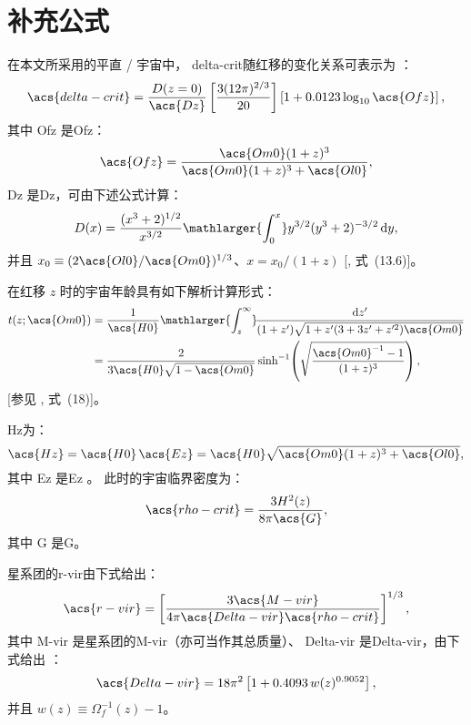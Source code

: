 
\chapter{补充公式}
\label{chap:formulas}


在本文所采用的平直 \lcdm/ 宇宙中，
\ac{delta-crit}随红移的变化关系可表示为 \cite{kitayama1996,randall2002}：
\begin{equation}
  \label{eq:delta-crit}
  \acs{delta-crit} = \frac{D(z=0)}{\acs{Dz}}
    \left[ \frac{3 (12\pi)^{2/3}}{20} \right]
    \left[1 + 0.0123 \log_{10} \acs{Ofz} \right] ,
\end{equation}
其中 \acs{Ofz} 是\acl{Ofz}：
\begin{equation}
  \label{eq:omega-fz}
  \acs{Ofz} = \frac{\acs{Om0} (1+z)^3}{\acs{Om0} (1+z)^3 + \acs{Ol0}} ,
\end{equation}
\acs{Dz} 是\acl{Dz}，可由下述公式计算：
\begin{equation}
  \label{eq:growth-factor}
  D(x) = \frac{(x^3 + 2)^{1/2}}{x^{3/2}}
    \mathlarger{\int_0^x} y^{3/2} (y^3 + 2)^{-3/2} \,\D{y} ,
\end{equation}
并且 $x_0 \equiv (2 \acs{Ol0}/\acs{Om0})^{1/3}$、$x = x_0 / (1+z)$
[\textcite{peebles1980}, 式~(13.6)]。

在红移 $z$ 时的宇宙年龄具有如下解析计算形式：
\begin{align}
  \label{eq:universe-age}
  t(z; \acs{Om0})
    & = \frac{1}{\acs{H0}} \mathlarger{\int_z^{\infty}}
      \!\frac{\D{z'}}{(1+z')\sqrt{1 + z' (3+3z'+z'^2) \acs{Om0}}}
      \nonumber \\
    & = \frac{2}{3 \acs{H0} \sqrt{1-\acs{Om0}}} \sinh^{-1}
      \!\left( \sqrt{\frac{\acs{Om0}^{-1} - 1}{(1+z)^3}} \right),
\end{align}
[参见 \textcite{thomas2000}, 式~(18)]。

\acl{Hz}为：
\begin{equation}
  \label{eq:hubble-z}
  \acs{Hz} = \acs{H0} \, \acs{Ez}
    = \acs{H0} \sqrt{\acs{Om0} (1+z)^3 + \acs{Ol0}} ,
\end{equation}
其中 \acs{Ez} 是\acl{Ez} \cite{hogg1999}。
此时的宇宙临界密度为：
\begin{equation}
  \label{eq:rho-crit}
  \acs{rho-crit} = \frac{3 H^2(z)}{8 \pi \acs{G}} ,
\end{equation}
其中 \acs{G} 是\acl{G}。

星系团的\ac{r-vir}由下式给出：
\begin{equation}
  \label{eq:radius-virial}
  \acs{r-vir} = \left[
    \frac{3 \acs{M-vir}}{4\pi \acs{Delta-vir} \acs{rho-crit}}
  \right]^{1/3},
\end{equation}
其中 \acs{M-vir} 是星系团的\acl{M-vir}（亦可当作其总质量）、
\acs{Delta-vir} 是\acl{Delta-vir}，由下式给出
\cite{kitayama1996,cassano2005}：
\begin{equation}
  \label{eq:delta-vir}
  \acs{Delta-vir} = 18\pi^2 \left[ 1 + 0.4093 \, w(z)^{0.9052} \right],
\end{equation}
并且 $w(z) \equiv \Omega_f^{-1}(z) - 1$。


